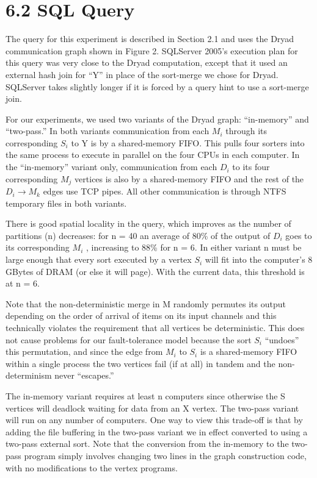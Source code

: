 \documentclass[
]{article}
\begin{document}
\section{6.2 SQL Query}\label{sql-query}

The query for this experiment is described in Section 2.1 and uses the
Dryad communication graph shown in Figure 2. SQLServer 2005's execution
plan for this query was very close to the Dryad computation, except that
it used an external hash join for ``Y'' in place of the sort-merge we
chose for Dryad. SQLServer takes slightly longer if it is forced by a
query hint to use a sort-merge join.

For our experiments, we used two variants of the Dryad graph:
``in-memory'' and ``two-pass.'' In both variants communication from each
\(M_{i}\) through its corresponding \(S_{i}\) to Y is by a shared-memory
FIFO. This pulls four sorters into the same process to execute in
parallel on the four CPUs in each computer. In the ``in-memory'' variant
only, communication from each \(D_{i}\) to its four corresponding
\(M_{j}\) vertices is also by a shared-memory FIFO and the rest of the
\(D_{i} \rightarrow M_{k}\) edges use TCP pipes. All other communication
is through NTFS temporary files in both variants.

There is good spatial locality in the query, which improves as the
number of partitions (n) decreases: for n = 40 an average of 80\% of the
output of \(D_{i}\) goes to its corresponding \(M_{i}\) , increasing to
88\% for n = 6. In either variant n must be large enough that every sort
executed by a vertex \(S_{i}\) will fit into the computer's 8 GBytes of
DRAM (or else it will page). With the current data, this threshold is at
n = 6.

Note that the non-deterministic merge in M randomly permutes its output
depending on the order of arrival of items on its input channels and
this technically violates the requirement that all vertices be
deterministic. This does not cause problems for our fault-tolerance
model because the sort \(S_{i}\) ``undoes'' this permutation, and since
the edge from \(M_{i}\) to \(S_{i}\) is a shared-memory FIFO within a
single process the two vertices fail (if at all) in tandem and the
non-determinism never ``escapes.''

The in-memory variant requires at least n computers since otherwise the
S vertices will deadlock waiting for data from an X vertex. The two-pass
variant will run on any number of computers. One way to view this
trade-off is that by adding the file buffering in the two-pass variant
we in effect converted to using a two-pass external sort. Note that the
conversion from the in-memory to the two-pass program simply involves
changing two lines in the graph construction code, with no modifications
to the vertex programs.
\end{document}

